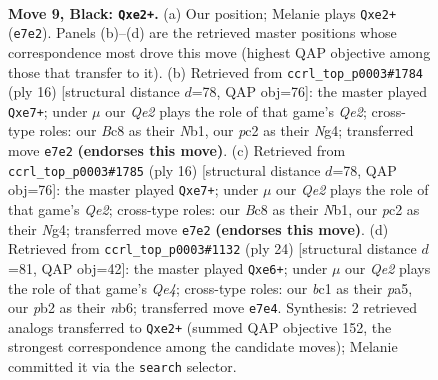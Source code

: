 \documentclass[11pt]{article}
\begin{document}
\clearpage

\begin{figure}[p]\centering
\begin{subfigure}{0.46\textwidth}\centering
\resizebox{\linewidth}{!}{%
\newchessgame
\chessboard[
  setfen={r1b1kb1r/p1p1qppp/2pP4/3n4/8/5P2/PPP1Q1PP/RNB1KB1R b KQkq - 0 9},
  showmover=false,
  pgfstyle=straightmove, color=movearrow, markmove={e7-e2}
]}
\caption{}
\end{subfigure}\hfill
\begin{subfigure}{0.46\textwidth}\centering
\resizebox{\linewidth}{!}{%
\newchessgame
\chessboard[
  setfen={rnb1kbnr/ppp1qp1p/3p4/8/3P1pNP/8/PPP1Q1P1/RNB1KB1R w KQkq - 2 9},
  showmover=false,
  pgfstyle=straightmove, color=movearrow, markmove={e2-e7}
]}
\caption{}
\end{subfigure}
\\[4pt]
\begin{subfigure}{0.46\textwidth}\centering
\resizebox{\linewidth}{!}{%
\newchessgame
\chessboard[
  setfen={rnb1kbnr/ppp1qp1p/3p4/8/3P1pNP/8/PPP1Q1P1/RNB1KB1R w KQkq - 2 9},
  showmover=false,
  pgfstyle=straightmove, color=movearrow, markmove={e2-e7}
]}
\caption{}
\end{subfigure}\hfill
\begin{subfigure}{0.46\textwidth}\centering
\resizebox{\linewidth}{!}{%
\newchessgame
\chessboard[
  setfen={r1b1kb1r/5ppp/1nppq3/p7/4Q2P/6P1/PPPN1P2/R1B1KB1R w KQkq - 0 13},
  showmover=false,
  pgfstyle=straightmove, color=movearrow, markmove={e4-e6}
]}
\caption{}
\end{subfigure}
\caption{\textbf{Move 9, Black: \texttt{Qxe2+}.} (a) Our position; Melanie plays \texttt{Qxe2+} (\texttt{e7e2}). Panels (b)--(d) are the retrieved master positions whose correspondence most drove this move (highest QAP objective among those that transfer to it). (b) Retrieved from \texttt{ccrl\_top\_p0003\#1784} (ply 16) [structural distance $d$=78, QAP obj=76]: the master played \texttt{Qxe7+}; under $\mu$ our \emph{Qe2} plays the role of that game's \emph{Qe2}; cross-type roles: our \emph{B}c8 as their \emph{N}b1, our \emph{p}c2 as their \emph{N}g4; transferred move \texttt{e7e2} \textbf{(endorses this move)}. (c) Retrieved from \texttt{ccrl\_top\_p0003\#1785} (ply 16) [structural distance $d$=78, QAP obj=76]: the master played \texttt{Qxe7+}; under $\mu$ our \emph{Qe2} plays the role of that game's \emph{Qe2}; cross-type roles: our \emph{B}c8 as their \emph{N}b1, our \emph{p}c2 as their \emph{N}g4; transferred move \texttt{e7e2} \textbf{(endorses this move)}. (d) Retrieved from \texttt{ccrl\_top\_p0003\#1132} (ply 24) [structural distance $d$=81, QAP obj=42]: the master played \texttt{Qxe6+}; under $\mu$ our \emph{Qe2} plays the role of that game's \emph{Qe4}; cross-type roles: our \emph{b}c1 as their \emph{p}a5, our \emph{p}b2 as their \emph{n}b6; transferred move \texttt{e7e4}. Synthesis: 2 retrieved analogs transferred to \texttt{Qxe2+} (summed QAP objective 152, the strongest correspondence among the candidate moves); Melanie committed it via the \texttt{search} selector.}
\label{fig:thought-m17}
\end{figure}
\end{document}
